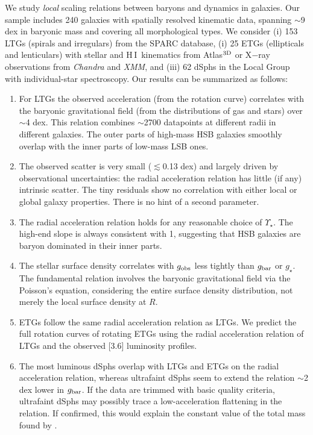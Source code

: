 \documentclass[apjl, twocolappendix]{emulateapj}
\newcommand{\hi } {{\rm H}\,{\small\rm I} \,}
\begin{document}
We study \textit{local} scaling relations between baryons and dynamics in galaxies. Our sample includes 240 galaxies with spatially resolved kinematic data, spanning $\sim$9 dex in baryonic mass and covering all morphological types. We consider (i) 153 LTGs (spirals and irregulars) from the SPARC database, (i) 25 ETGs (ellipticals and lenticulars) with stellar and \hi kinematics from Atlas$^{\rm 3D}$ or X$-$ray observations from \emph{Chandra} and \emph{XMM}, and (iii) 62 dSphs in the Local Group with individual-star spectroscopy. Our results can be summarized as follows:
\begin{enumerate}
\item For LTGs the observed acceleration (from the rotation curve) correlates with the baryonic gravitational field (from the distributions of gas and stars) over $\sim$4 dex. This relation combines $\sim$2700 datapoints at different radii in different galaxies. The outer parts of high-mass HSB galaxies smoothly overlap with the inner parts of low-mass LSB ones.
\item The observed scatter is very small ($\lesssim$0.13 dex) and largely driven by observational uncertainties: the radial acceleration relation has little (if any) intrinsic scatter. The tiny residuals show no correlation with either local or global galaxy properties. There is no hint of a second parameter.
\item The radial acceleration relation holds for any reasonable choice of $\Upsilon_{\star}$. The high-end slope is always consistent with 1, suggesting that HSB galaxies are baryon dominated in their inner parts.
\item The stellar surface density correlates with $g_{\rm obs}$ less tightly than $g_{\rm bar}$ or $g_{\star}$. The fundamental relation involves the baryonic gravitational field via the Poisson's equation, considering the entire surface density distribution, not merely the local surface density at $R$.  
\item ETGs follow the same radial acceleration relation as LTGs. We predict the full rotation curves of rotating ETGs using the radial acceleration relation of LTGs and the observed [3.6] luminosity profiles.   
 \item The most luminous dSphs overlap with LTGs and ETGs on the radial acceleration relation, whereas ultrafaint dSphs seem to extend the relation $\sim$2 dex lower in $g_{\rm bar}$. If the data are trimmed with basic quality criteria, ultrafaint dSphs may possibly trace a low-acceleration flattening in the relation. If confirmed, this would explain the constant value of the total mass found by \citet{Strigari2008}.
 \end{enumerate}
 
\end{document}
